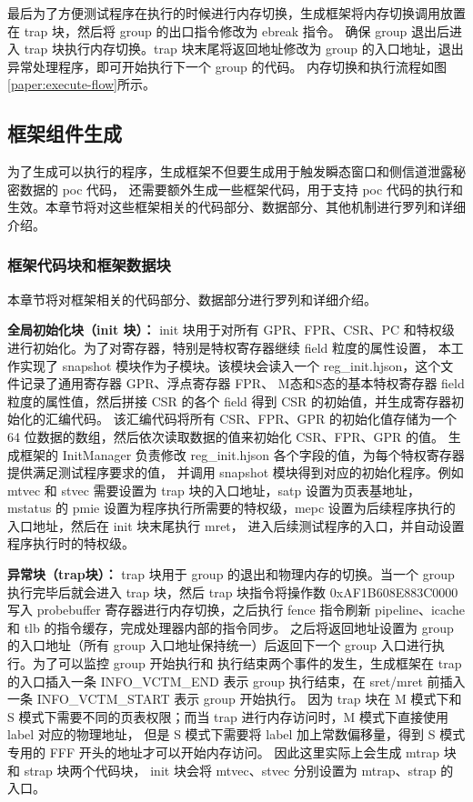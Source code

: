 最后为了方便测试程序在执行的时候进行内存切换，生成框架将内存切换调用放置在 trap 块，然后将 group 的出口指令修改为 ebreak 指令。
确保 group 退出后进入 trap 块执行内存切换。trap 块末尾将返回地址修改为 group 的入口地址，退出异常处理程序，即可开始执行下一个 group 的代码。
内存切换和执行流程如图\ref{paper:execute-flow}所示。\par

\subsection{框架组件生成}

为了生成可以执行的程序，生成框架不但要生成用于触发瞬态窗口和侧信道泄露秘密数据的 poc 代码，
还需要额外生成一些框架代码，用于支持 poc 代码的执行和生效。本章节将对这些框架相关的代码部分、数据部分、其他机制进行罗列和详细介绍。\par

\subsubsection{框架代码块和框架数据块}
本章节将对框架相关的代码部分、数据部分进行罗列和详细介绍。

\textbf{全局初始化块（init 块）：}
init 块用于对所有 GPR、FPR、CSR、PC 和特权级进行初始化。为了对寄存器，特别是特权寄存器继续 field 粒度的属性设置，
本工作实现了 snapshot 模块作为子模块。该模块会读入一个 reg\_init.hjson，这个文件记录了通用寄存器 GPR、浮点寄存器 FPR、
M态和S态的基本特权寄存器 field 粒度的属性值，然后拼接 CSR 的各个 field 得到 CSR 的初始值，并生成寄存器初始化的汇编代码。
该汇编代码将所有 CSR、FPR、GPR 的初始化值存储为一个 64 位数据的数组，然后依次读取数据的值来初始化 CSR、FPR、GPR 的值。
生成框架的 InitManager 负责修改 reg\_init.hjson 各个字段的值，为每个特权寄存器提供满足测试程序要求的值，
并调用 snapshot 模块得到对应的初始化程序。例如 mtvec 和 stvec 需要设置为 trap 块的入口地址，satp 设置为页表基地址，
mstatus 的 pmie 设置为程序执行所需要的特权级，mepc 设置为后续程序执行的入口地址，然后在 init 块末尾执行 mret，
进入后续测试程序的入口，并自动设置程序执行时的特权级。\par

\textbf{异常块（trap块）：}
trap 块用于 group 的退出和物理内存的切换。当一个 group 执行完毕后就会进入 trap 块，然后 trap 块指令将操作数 0xAF1B608E883C0000
写入 probebuffer 寄存器进行内存切换，之后执行 fence 指令刷新 pipeline、icache 和 tlb 的指令缓存，完成处理器内部的指令同步。
之后将返回地址设置为 group 的入口地址（所有 group 入口地址保持统一）后返回下一个 group 入口进行执行。为了可以监控 group 开始执行和
执行结束两个事件的发生，生成框架在 trap 的入口插入一条 INFO\_VCTM\_END 表示 group 执行结束，在 sret/mret 前插入一条 INFO\_VCTM\_START 表示 group 开始执行。
因为 trap 块在 M 模式下和 S 模式下需要不同的页表权限；而当 trap 进行内存访问时，M 模式下直接使用 label 对应的物理地址，
但是 S 模式下需要将 label 加上常数偏移量，得到 S 模式专用的 FFF 开头的地址才可以开始内存访问。
因此这里实际上会生成 mtrap 块和 strap 块两个代码块，
init 块会将 mtvec、stvec 分别设置为 mtrap、strap 的入口。\par

